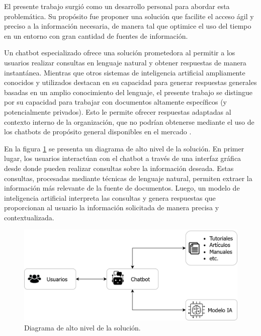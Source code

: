 El presente trabajo surgió como un desarrollo personal para abordar esta problemática. Su propósito fue 
proponer una solución que facilite el acceso ágil y preciso a la información necesaria, de manera tal
que optimice el uso del tiempo en un entorno con gran cantidad de fuentes de información.

Un chatbot especializado ofrece una solución prometedora al permitir a los usuarios realizar 
consultas en lenguaje natural y obtener respuestas de manera instantánea. Mientras que otros sistemas 
de inteligencia artificial ampliamente conocidos y utilizados 
destacan en su capacidad para generar respuestas generales basadas en un amplio conocimiento del 
lenguaje, el presente trabajo se distingue por su capacidad para trabajar con documentos altamente 
específicos (y potencialmente privados). Esto le permite ofrecer respuestas adaptadas al contexto 
interno de la organización, que no podrían obtenerse mediante el uso de los chatbots de 
propósito general disponibles en el mercado \citep{website:chatgpt} \citep{website:copilot} \citep{website:gemini}.

En la figura \ref{fig:diagrama-bloques-basico} se presenta un diagrama de alto nivel de la solución.
En primer lugar, los usuarios interactúan con el chatbot a través de una interfaz gráfica desde donde
pueden realizar consultas sobre la información deseada. Estas consultas, procesadas mediante 
técnicas de lenguaje natural, permiten extraer la información más relevante de la fuente de documentos. 
Luego, un modelo de inteligencia artificial interpreta las consultas y genera respuestas que proporcionan 
al usuario la información solicitada de manera precisa y contextualizada.

\begin{figure}[ht]
	\centering
	\includegraphics[scale=.3]{./Figures/diagrama_bloques_basico.png}
	\caption{Diagrama de alto nivel de la solución.}
	\label{fig:diagrama-bloques-basico}
\end{figure}

